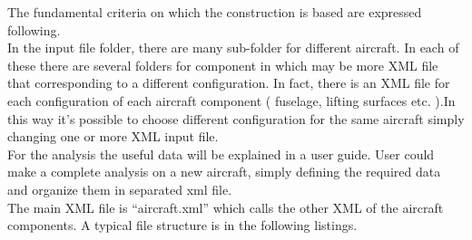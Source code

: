 The fundamental criteria on which the construction is based are expressed following.\\
In the input file folder, there are many sub-folder for different aircraft. In each of these there are several folders for component in which may be more XML file that corresponding to a different configuration. In fact, there is an XML file for each configuration of each aircraft component ( fuselage, lifting surfaces etc. ).In this way it's possible to choose different configuration for the same aircraft simply changing one or more XML input file.\\
 For the analysis the useful data will be explained in a user guide. User could make a complete analysis on a new aircraft, simply defining the required data and organize them in separated xml file. \\
 The main XML file is ``aircraft.xml'' which calls the other XML of the aircraft components. A typical file structure is in the following listings.
 
